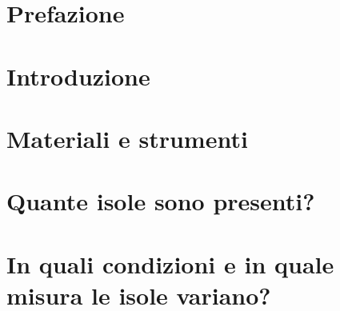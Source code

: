 \documentclass[12pt,a4paper,italian,twoside]{scrbook}
\begin{document}
\frontmatter


\tableofcontents
\listoffigures
\listoftables
\chapter{Prefazione}




\mainmatter
\chapter{Introduzione}




\chapter{Materiali e strumenti}




\chapter{Quante isole sono presenti?}







\chapter{In quali condizioni e in quale misura le isole variano?}




\end{document}
